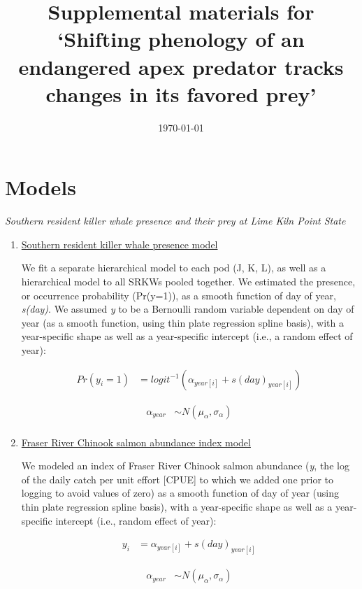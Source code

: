 \documentclass{article}
\begin{document}



\title{Supplemental materials for `Shifting phenology of an endangered apex predator tracks changes in its favored prey'}
\date{\today}
\maketitle
\author{}
\renewcommand{\thetable}{S\arabic{table}}
\renewcommand{\thefigure}{S\arabic{figure}}
\section*{Models}
\emph{Southern resident killer whale presence and their prey at Lime Kiln Point State}
\begin{enumerate}
\item \underline{Southern resident killer whale presence model}
\par We fit a separate hierarchical model to each pod (J, K, L), as well as a hierarchical model to all SRKWs pooled together. We estimated the presence, or occurrence probability (Pr(y=1)), as a smooth function of day of year, \emph{s(day)}. We assumed \emph{y} to be a Bernoulli random variable dependent on day of year (as a smooth function, using thin plate regression spline basis), with a year-specific shape as well as a year-specific intercept (i.e., a random effect of year):


\begin{align*}
Pr(y_i = 1) &= logit^{-1} (\alpha_{year[i]} + s(day)_{year[i]})
\end{align*}

\begin{align*}
\alpha_{year} & \sim N(\mu_{\alpha}, \sigma_{\alpha}) \\
\end{align*}


\item \underline{Fraser River Chinook salmon abundance index model}

We modeled an index of Fraser River Chinook salmon abundance (\emph{y}, the log of the daily catch per unit effort [CPUE] to which we added one prior to logging to avoid values of zero) as a smooth function of day of year (using thin plate regression spline basis), with a year-specific shape as well as a year-specific intercept (i.e., random effect of year):


\begin{align*}
y_i &= \alpha_{year[i]} + s(day)_{year[i]}
\end{align*}

\begin{align*}
\alpha_{year} & \sim N(\mu_{\alpha}, \sigma_{\alpha}) \\
\end{align*}

\end{enumerate}
\end{document}
